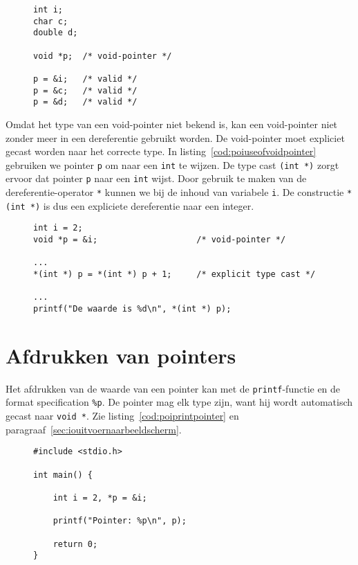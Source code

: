 \begin{figure}[!ht]
\begin{lstlisting}[caption=Definitie en initialisatie van een \texttt{void}-pointer.]
int i;
char c;
double d;

void *p;  /* void-pointer */

p = &i;   /* valid */
p = &c;   /* valid */
p = &d;   /* valid */
\end{lstlisting}
\end{figure}

Omdat het type van een void-pointer niet bekend is, kan een void-pointer niet zonder meer in een dereferentie gebruikt worden. De void-pointer moet expliciet gecast worden naar het correcte type. In listing~\ref{cod:poiuseofvoidpointer} gebruiken we pointer \texttt{p} om naar een \texttt{int} te wijzen. De type cast \texttt{(int *)} zorgt ervoor dat pointer \texttt{p} naar een \texttt{int} wijst. Door gebruik te maken van de dereferentie-operator \texttt{*} kunnen we bij de inhoud van variabele \texttt{i}. De constructie \texttt{*(int *)} is dus een expliciete dereferentie naar een integer.

\begin{figure}[!ht]
\begin{lstlisting}[caption={Definitie, initialisatie en deference van een \texttt{void}-pointer.},label=cod:poiuseofvoidpointer]
int i = 2;
void *p = &i;                    /* void-pointer */

...
*(int *) p = *(int *) p + 1;     /* explicit type cast */

...
printf("De waarde is %d\n", *(int *) p);
\end{lstlisting}
\end{figure}


\section{Afdrukken van pointers}
\label{sec:afdrukkenvanpointers}
Het afdrukken van de waarde van een pointer kan met de \texttt{printf}-functie en de format specification \texttt{\%p}. De pointer mag elk type zijn, want hij wordt automatisch gecast naar \texttt{void *}. Zie listing~\ref{cod:poiprintpointer} en paragraaf~\ref{sec:iouitvoernaarbeeldscherm}.

\begin{figure}[!ht]
\begin{lstlisting}[caption=Afdrukken van een pointer.,label=cod:poiprintpointer]
#include <stdio.h>

int main() {

    int i = 2, *p = &i;

    printf("Pointer: %p\n", p);

    return 0;
}
\end{lstlisting}
\end{figure}


